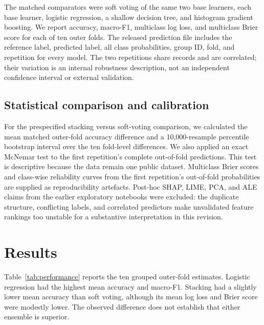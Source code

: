 \documentclass[preprint,12pt]{elsarticle}
\begin{document}
The matched comparators were soft voting of the same two base learners, each base learner, logistic regression, a shallow decision tree, and histogram gradient boosting. We report accuracy, macro-F1, multiclass log loss, and multiclass Brier score for each of ten outer folds. The released prediction file includes the reference label, predicted label, all class probabilities, group ID, fold, and repetition for every model. The two repetitions share records and are correlated; their variation is an internal robustness description, not an independent confidence interval or external validation.

\subsection{Statistical comparison and calibration}

For the prespecified stacking versus soft-voting comparison, we calculated the mean matched outer-fold accuracy difference and a 10,000-resample percentile bootstrap interval over the ten fold-level differences. We also applied an exact McNemar test to the first repetition's complete out-of-fold predictions. This test is descriptive because the data remain one public dataset. Multiclass Brier scores and class-wise reliability curves from the first repetition's out-of-fold probabilities are supplied as reproducibility artefacts. Post-hoc SHAP, LIME, PCA, and ALE claims from the earlier exploratory notebooks were excluded: the duplicate structure, conflicting labels, and correlated predictors make unvalidated feature rankings too unstable for a substantive interpretation in this revision.

\section{Results}

Table~\ref{tab:performance} reports the ten grouped outer-fold estimates. Logistic regression had the highest mean accuracy and macro-F1. Stacking had a slightly lower mean accuracy than soft voting, although its mean log loss and Brier score were modestly lower. The observed difference does not establish that either ensemble is superior.
\end{document}
